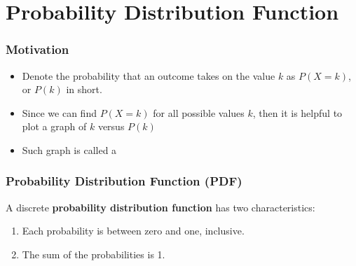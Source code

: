 \section[PDF]{Probability Distribution Function}
\frame{\sectionpage}

\begin{frame}
\frametitle{Motivation}
\begin{remark}{}
\begin{itemize}
\item Denote the probability that an outcome takes on the value $k$ as $P(X=k)$, or $P(k)$ in short.
\item Since we can find $P(X = k)$ for all possible values $k$, then it is helpful to plot a graph of $k$ versus $P(k)$

\item Such graph is called a 
\end{itemize}
\end{remark}
\end{frame}

\begin{frame}
\frametitle{Probability Distribution Function (PDF)}
\begin{defn}{}{}
A discrete \textbf{probability distribution function} has two characteristics:
\begin{enumerate}
\item Each probability is between zero and one, inclusive.
\item The sum of the probabilities is 1.
\end{enumerate}
\end{defn}
\end{frame}


